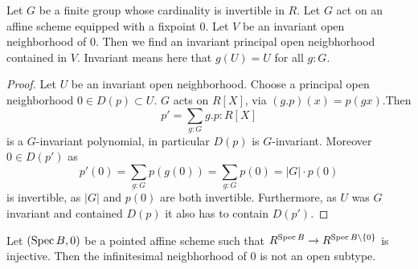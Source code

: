 %
\begin{lemma}
	Let $G$ be a finite group whose cardinality is invertible in $R$. Let $G$ act on an affine scheme equipped with a fixpoint $0$. Let $V$ be an invariant open neighborhood of 0. Then we find an invariant principal open neigbhorhood contained in $V$. Invariant means here that $g(U) = U$ for all $g : G$.%
\end{lemma}
\begin{proof}
	Let $U$ be an invariant open neighborhood. Choose a principal open neighborhood $0 \in D(p) \subset U$. $G$ acts on $R[X]$, via $(g.p)(x) = p(g x)$.Then 
	\[p' = \sum_{g : G} g . p : R[X]\]
	is a $G$-invariant polynomial, in particular $D(p)$ is $G$-invariant. Moreover $0 \in D(p')$ as
	\[
	p'(0) = \sum_{g : G} p(g(0)) = \sum_{g : G} p (0) = |G| \cdot p(0) 
	\]
	is invertible, as $|G|$ and $p(0)$ are both invertible. Furthermore, as $U$ was $G$ invariant and contained $D(p)$ it also has to contain $D(p')$.
\end{proof}
\begin{lemma}
	Let $(\operatorname{Spec} B, 0)$ be a pointed affine scheme such that $R^{\operatorname{Spec} B} \to R^{\operatorname{Spec} B \setminus \{0\}}$ is injective. %
	Then the infinitesimal neigbhorhood of $0$ is not an open subtype.
\end{lemma}
